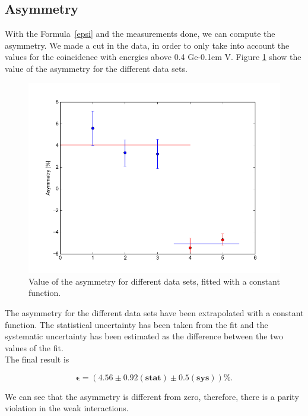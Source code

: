\documentclass[10pt,swedish, openany]{book}
\def\MeV{\ifmmode {\mathrm{\ Me\kern -0.1em V}}\else
                   \textrm{Ge\kern -0.1em V}\fi}%
\begin{document}
\subsection{Asymmetry}

With the Formula~\ref{epsi} and the measurements done, we can compute the asymmetry. We made a cut in the data, in order to only take into account the values for the coincidence with energies above 0.4 \MeV. Figure \ref{fig:asymfit} show the value of the asymmetry for the different data sets.

\begin{figure}[H]
\includegraphics[scale=0.3]{epsilon.png}
\centering
\caption{Value of the asymmetry for different data sets, fitted with a constant function.}
\label{fig:asymfit}
\end{figure}

The asymmetry for the different data sets have been extrapolated with a constant function. The statistical uncertainty has been taken from the fit and the systematic uncertainty has been estimated as the difference between the two values of the fit. \\

The final result is 

\begin{equation*}
    \mathbf{\epsilon = (4.56 \pm 0.92 (stat) \pm 0.5 (sys))\%}.
\end{equation*}

We can see that the asymmetry is different from zero, therefore, there is a parity violation in the weak interactions.\\
\end{document}
